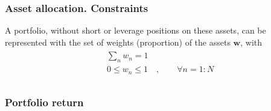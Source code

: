 \documentclass[letterpaper,10pt,english]{jupyterBook}
\begin{document}
\subsubsection*{Asset allocation. Constraints}

\sphinxAtStartPar
A portfolio, without short or leverage positions on these assets, can be represented with the set of weights (proportion) of the assets \(\mathbf{w}\), with
\begin{equation*}
\begin{split}\begin{aligned}
  & \sum_n w_n = 1 \\
  & 0 \le w_n \le 1 \quad , \qquad \forall n = 1:N  \\
\end{aligned}\end{split}
\end{equation*}\subsubsection*{Portfolio return}
\end{document}
